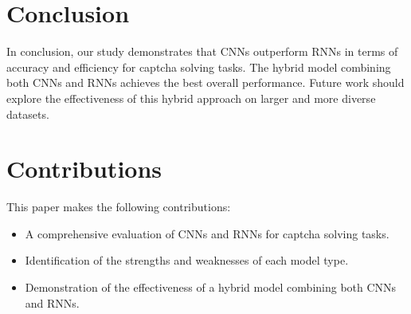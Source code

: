 \documentclass{article}
\begin{document}
\section{Conclusion}
In conclusion, our study demonstrates that CNNs outperform RNNs in terms of accuracy and efficiency for captcha solving tasks. The hybrid model combining both CNNs and RNNs achieves the best overall performance. Future work should explore the effectiveness of this hybrid approach on larger and more diverse datasets.

\section{Contributions}
This paper makes the following contributions:
\begin{itemize}
    \item A comprehensive evaluation of CNNs and RNNs for captcha solving tasks.
    \item Identification of the strengths and weaknesses of each model type.
    \item Demonstration of the effectiveness of a hybrid model combining both CNNs and RNNs.
\end{itemize}



\end{document}
